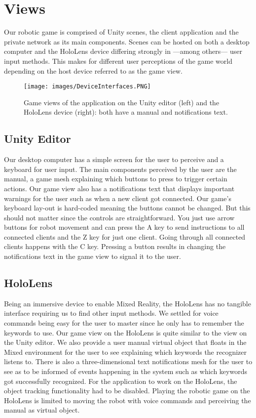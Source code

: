 \section{Views}
Our robotic game is comprised of Unity scenes, the client application and the private network as its main components. Scenes can be hosted on both a desktop computer and the HoloLens device differing strongly in ---among others--- user input methods. This makes for different user perceptions of the game world depending on the host device referred to as the game view. 


\begin{figure}[!htb]
	\texttt{[image: images/DeviceInterfaces.PNG]}
	\captionsetup{width=1.0\textwidth}
	\centering
	\caption{Game views of the application on the Unity editor (left) and the HoloLens device (right): both have a manual and notifications text.
	}
\end{figure}

\subsection{Unity Editor}
Our desktop computer has a simple screen for the user to perceive and a keyboard for user input. The main components perceived by the user are the manual, a game mesh explaining which buttons to press to trigger certain actions. Our game view also has a notifications text that displays important warnings for the user such as when a new client got connected.
Our game's keyboard lay-out is hard-coded meaning the buttons cannot be changed. But this should not matter since the controls are straightforward. You just use arrow buttons for robot movement and can press the A key to send instructions to all connected clients and the Z key for just one client. Going through all connected clients happens with the C key. Pressing a button results in changing the notifications text in the game view to signal it to the user.

\subsection{HoloLens}
Being an immersive device to enable Mixed Reality, the HoloLens has no tangible interface requiring us to find other input methods. We settled for voice commands being easy for the user to master since he only has to remember the keywords to use. Our game view on the HoloLens is quite similar to the view on the Unity editor. We also provide a user manual virtual object that floats in the Mixed environment for the user to see explaining which keywords the recognizer listens to. There is also a three-dimensional text notifications mesh for the user to see as to be informed of events happening in the system such as which keywords got successfully recognized. For the application to work on the HoloLens, the object tracking functionality had to be disabled. Playing the robotic game on the HoloLens is limited to moving the robot with voice commands and perceiving the manual as virtual object.

